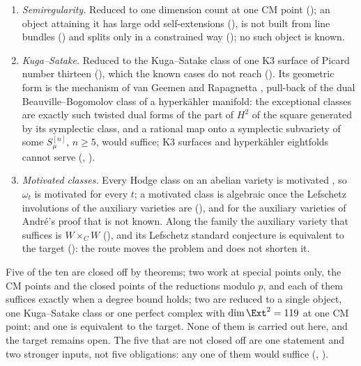\begin{remark}
\begin{enumerate}[label=\textup{(\arabic*)},leftmargin=2.6em,itemsep=2pt]
  of the curve the class is a $\QQ_{\ell}$-combination of algebraic cycles
  (), by Li's theorem \cite[Theorem~1.1]{Li26}; this
  suffices, with no lifting step, exactly when the Hilbert data of the cycles
  are bounded on a Zariski dense set of closed points of the arithmetic model
  (), and no bound is known.
\item \emph{Semiregularity.} Reduced to one dimension count at one CM point
  (); an object attaining it has large odd
  self-extensions (), is not built from line
  bundles () and splits only in a constrained way
  (); no such object is known.
\item \emph{Kuga--Satake.} Reduced to the Kuga--Satake class of one K3 surface
  of Picard number thirteen (), which the known cases do
  not reach (). Its geometric form is the mechanism of
  van Geemen and Rapagnetta \cite{vGR26}, pull-back of the dual
  Beauville--Bogomolov class of a hyperk\"ahler manifold: the exceptional
  classes are exactly such twisted dual forms of the part of $H^{2}$ of the
  square generated by its symplectic class, and a rational map onto a
  symplectic subvariety of some $S_{\mu}^{[n]}$, $n\ge5$, would suffice;
  K3 surfaces and hyperk\"ahler eightfolds cannot serve
  (, ).
\item \emph{Motivated classes.} Every Hodge class on an abelian variety is
  motivated \cite[Th\'eor\`eme~0.6.2]{And96b}, so $\omega_{t}$ is motivated for
  every $t$; a motivated class is algebraic once the Lefschetz involutions of
  the auxiliary varieties are (), and for the auxiliary
  varieties of Andr\'e's proof that is not known. Along the family the auxiliary variety
  that suffices is $W\times_{C}W$ (), and its
  Lefschetz standard conjecture is equivalent to the target
  (): the route moves the problem and does not shorten
  it.
\end{enumerate}
Five of the ten are closed off by theorems; two work at special points
only, the CM points and the closed points of the reductions modulo $p$, and
each of them suffices exactly when a degree bound holds; two are reduced to a
single object, one Kuga--Satake class or one perfect complex with
$\dim\Ext^{2}=119$ at one CM point; and one is equivalent to the target. None
of them is carried out here, and the target remains open. The five that are
not closed off are one statement and two stronger inputs, not five
obligations: any one of them would suffice (,
).
\end{remark}

